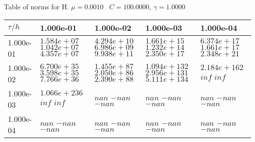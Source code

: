 \begin{center}
Table of norms for H. $\mu = 0.0010$ \, $C = 100.0000$, $\gamma = 1.0000$
  
\begin{tabular}{|p{1in}|p{1in}|p{1in}|p{1in}|p{1in}|} \hline
$\tau / h$ &1.000e-01 &1.000e-02 &1.000e-03 &1.000e-04 \\ \hline 
1.000e-01 & $1.584e+07$  $1.042e+07$  $4.357e+07$  & $4.294e+10$  $6.986e+09$  $9.938e+11$  & $1.661e+15$  $1.232e+14$  $2.350e+17$  & $6.374e+17$  $1.661e+17$  $2.348e+21$  \\ \hline 
1.000e-02 & $6.700e+35$  $3.598e+35$  $7.766e+36$  & $1.455e+87$  $2.050e+86$  $2.390e+88$  & $1.094e+132$  $2.956e+131$  $5.111e+134$  & $2.184e+162$  $inf$  $inf$  \\ \hline 
1.000e-03 & $1.066e+236$  $inf$  $inf$  & $nan$  $-nan$  $-nan$  & $nan$  $-nan$  $-nan$  & $nan$  $-nan$  $-nan$  \\ \hline 
1.000e-04 & $nan$  $-nan$  $-nan$  & $nan$  $-nan$  $-nan$  & $nan$  $-nan$  $-nan$  & $nan$  $-nan$  $-nan$  \\ \hline 

\end{tabular}\\[20pt]
\end{center}
